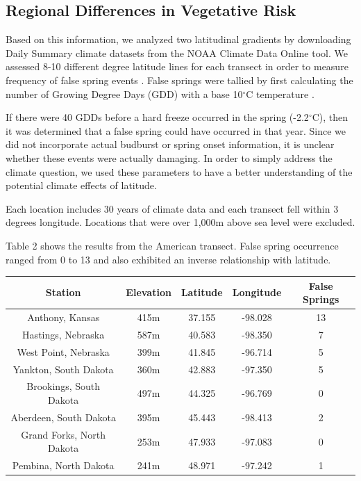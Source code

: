 \documentclass{article}\usepackage[]{graphicx}\usepackage[]{color}
\begin{document}
\subsection*{Regional Differences in Vegetative Risk}
Based on this information, we analyzed two latitudinal gradients by downloading Daily Summary climate datasets from the NOAA Climate Data Online tool. We assessed 8-10 different degree latitude lines for each transect in order to measure frequency of false spring events \citep{Menne2012, Menne2012b}. False springs were tallied by first calculating the number of Growing Degree Days (GDD) with a base 10$^{\circ}$C temperature \citep{Nugent2005}.

If there were 40 GDDs before a hard freeze occurred in the spring (-2.2$^{\circ}$C), then it was determined that a false spring could have occurred in that year. Since we did not incorporate actual budburst or spring onset information, it is unclear whether these events were actually damaging. In order to simply address the climate question, we used these parameters to have a better understanding of the potential climate effects of latitude. 

Each location includes 30 years of climate data and each transect fell within 3 degrees longitude. Locations that were over 1,000m above sea level were excluded. 

Table 2 shows the results from the American transect. False spring occurrence ranged from 0 to 13 and also exhibited an inverse relationship with latitude. 

\begin{center}
 \label{tab:title2} 
\begin{tabular}{c c c c c}
\hline
Station & Elevation & Latitude & Longitude & False Springs \\
\hline
Anthony, Kansas & 415m & 37.155 & -98.028 & 13 \\
Hastings, Nebraska & 587m & 40.583 & -98.350  & 7 \\
West Point, Nebraska & 399m & 41.845 & -96.714 & 5 \\
Yankton, South Dakota & 360m & 42.883 & -97.350 & 5 \\
Brookings, South Dakota & 497m & 44.325 & -96.769 & 0 \\
Aberdeen, South Dakota & 395m & 45.443 & -98.413 & 2 \\
Grand Forks, North Dakota & 253m & 47.933 & -97.083 & 0 \\
Pembina, North Dakota & 241m & 48.971 & -97.242 & 1 \\
\hline
\end{tabular}
\end{center}




\end{document}

